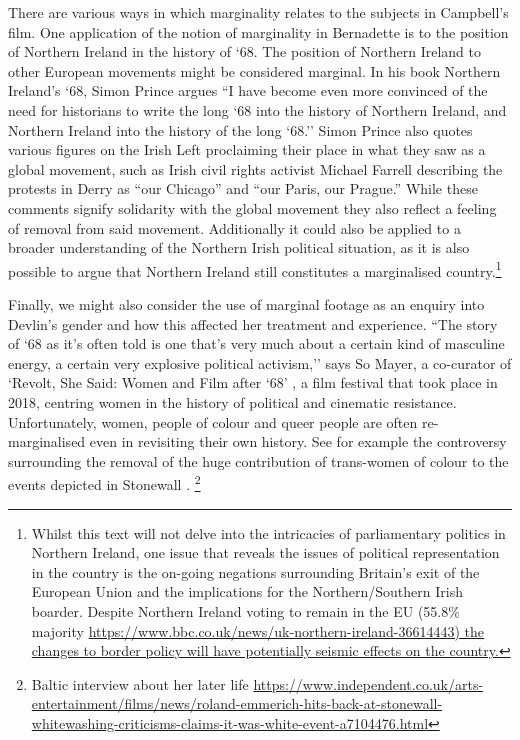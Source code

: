 \documentclass[12pt]{article}
\begin{document}
There are various ways in which marginality relates to the subjects in Campbell's film. One application of the notion of marginality in Bernadette is to the position of Northern Ireland in the history of `68. The position of Northern Ireland to other European movements might be considered marginal. In his book Northern Ireland's `68, Simon Prince argues ``I have become even more convinced of the need for historians to write the long `68 into the history of Northern Ireland, and Northern Ireland into the history of the long `68.'' Simon Prince also quotes various figures on the Irish Left proclaiming their place in what they saw as a global movement, such as Irish civil rights activist Michael Farrell describing the protests in Derry as ``our Chicago'' and ``our Paris, our Prague.''\cite{Prince:2007aa} While these comments signify solidarity with the global movement they also reflect a feeling of removal from said movement. Additionally it could also be applied to a broader understanding of the Northern Irish political situation, as it is also possible to argue that Northern Ireland still constitutes a marginalised country.\footnote{Whilst this text will not delve into the intricacies of parliamentary politics in Northern Ireland, one issue that reveals the issues of political representation in the country is the on-going negations surrounding Britain’s exit of the European Union and the implications for the Northern/Southern Irish boarder. Despite Northern Ireland voting to remain in the EU (55.8\% majority \url{https://www.bbc.co.uk/news/uk-northern-ireland-36614443) the changes to border policy will have potentially seismic effects on the country.}} 

Finally, we might also consider the use of marginal footage as an enquiry into Devlin's gender and how this affected her treatment and experience. ``The story of `68 as it's often told is one that's very much about a certain kind of masculine energy, a certain very explosive political activism,''  says So Mayer, a co-curator of `Revolt, She Said: Women and Film after `68' \citeyear{Mayer:1992aa,Hutchinson:2018aa}, a film festival that took place in 2018, centring women in the history of political and cinematic resistance. Unfortunately, women, people of colour and queer people are often re-marginalised even in revisiting their own history. See for example the controversy surrounding the removal of the huge contribution of trans-women of colour to the events depicted in Stonewall \citeyear{Emmerich:2015aa}. \footnote{Baltic interview about her later life \url{https://www.independent.co.uk/arts-entertainment/films/news/roland-emmerich-hits-back-at-stonewall-whitewashing-criticisms-claims-it-was-white-event-a7104476.html}}
\end{document}
